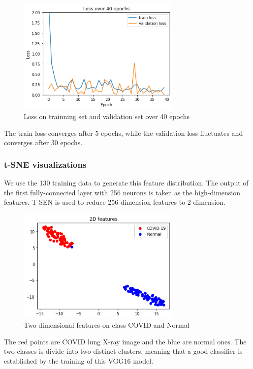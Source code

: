 \documentclass[a4paper,10pt]{article}
\begin{document}
\begin{figure}[H]
  \centering
  \includegraphics[width=8cm]{./images/task1-loss.png}
     \caption{Loss on trainning set and validation set over 40 epochs}
        \label{task1-loss}
\end{figure}

The train loss converges after 5 epochs, 
while the validation loss fluctuates and converges after 30 epochs.

\subsubsection{t-SNE visualizations}

We use the 130 training data to generate this feature distribution. 
The output of the first fully-connected layer with 256 neurons is taken as 
the high-dimension features. T-SEN is used to reduce 256 dimension features to 2 dimension.

\begin{figure}[H]
  \centering
  \includegraphics[width=8cm]{./images/task1-tsen.png}
     \caption{Two dimensional features on class COVID and Normal}
        \label{task1-tsen}
\end{figure}

The red points are COVID lung X-ray image and the blue are normal ones. 
The two classes is divide into two distinct clusters, 
meaning that a good classifier is established by the training of this VGG16 model.
\end{document}

